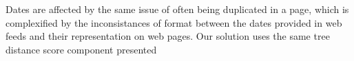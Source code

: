 Dates are affected by the same issue of often being duplicated in a page, which is complexified by the inconsistances of format between the dates provided in web feeds and their representation on web pages. Our solution uses the same tree distance score component presented

